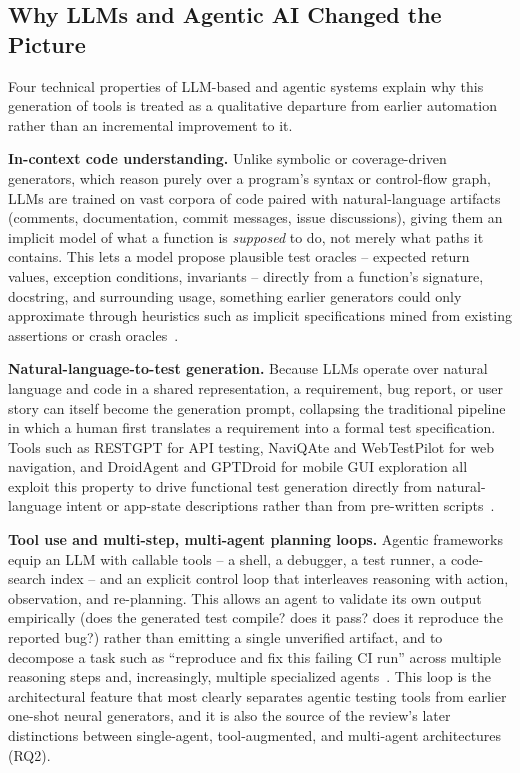 \subsection{Why LLMs and Agentic AI Changed the Picture}
Four technical properties of LLM-based and agentic systems explain why
this generation of tools is treated as a qualitative departure from
earlier automation rather than an incremental improvement to it.

\textbf{In-context code understanding.} Unlike symbolic or
coverage-driven generators, which reason purely over a program's
syntax or control-flow graph, LLMs are trained on vast corpora of code
paired with natural-language artifacts (comments, documentation,
commit messages, issue discussions), giving them an implicit model of
what a function is \emph{supposed} to do, not merely what paths it
contains. This lets a model propose plausible test oracles -- expected
return values, exception conditions, invariants -- directly from a
function's signature, docstring, and surrounding usage, something
earlier generators could only approximate through heuristics such as
implicit specifications mined from existing assertions or crash
oracles~\cite{dinella2022,hossain2023,o32024}.

\textbf{Natural-language-to-test generation.} Because LLMs operate
over natural language and code in a shared representation, a
requirement, bug report, or user story can itself become the
generation prompt, collapsing the traditional pipeline in which a
human first translates a requirement into a formal test specification.
Tools such as RESTGPT for API testing, NaviQAte and WebTestPilot for
web navigation, and DroidAgent and GPTDroid for mobile GUI exploration
all exploit this property to drive functional test generation directly
from natural-language intent or app-state descriptions rather than
from pre-written scripts~\cite{kim2024,shahbandeh2024,g62026,yoon2023,liu2024}.

\textbf{Tool use and multi-step, multi-agent planning loops.} Agentic
frameworks equip an LLM with callable tools -- a shell, a debugger, a
test runner, a code-search index -- and an explicit control loop that
interleaves reasoning with action, observation, and re-planning. This
allows an agent to validate its own output empirically (does the
generated test compile? does it pass? does it reproduce the reported
bug?) rather than emitting a single unverified artifact, and to
decompose a task such as ``reproduce and fix this failing CI run''
across multiple reasoning steps and, increasingly, multiple
specialized agents~\cite{slr0232024,slr0282024,slr0602026,stennett2025}.
This loop is the architectural feature that most clearly separates
agentic testing tools from earlier one-shot neural generators, and it
is also the source of the review's later distinctions between
single-agent, tool-augmented, and multi-agent architectures (RQ2).

